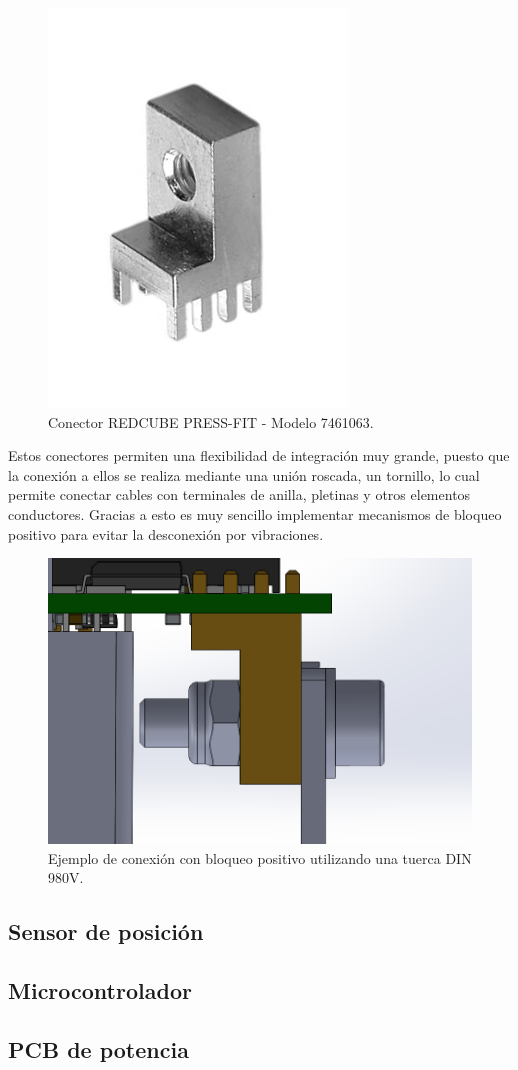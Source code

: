 \begin{figure}[H]
	\centering
	\includegraphics[width=0.35\linewidth]{fig/pressfit}
	\caption{Conector REDCUBE PRESS-FIT - Modelo 7461063.}
\end{figure}

Estos conectores permiten una flexibilidad de integración muy grande, puesto que la conexión a ellos se realiza mediante una unión roscada, un tornillo, lo cual permite conectar cables con terminales de anilla, pletinas y otros elementos conductores. Gracias a esto es muy sencillo implementar mecanismos de bloqueo positivo para evitar la desconexión por vibraciones.

\begin{figure}[H]
	\centering
	\includegraphics[width=0.5\linewidth]{fig/pressfit-980v}
	\caption{Ejemplo de conexión con bloqueo positivo utilizando una tuerca DIN 980V.}
\end{figure}

\subsection{Sensor de posición}

\subsection{Microcontrolador}

\subsection{PCB de potencia}

